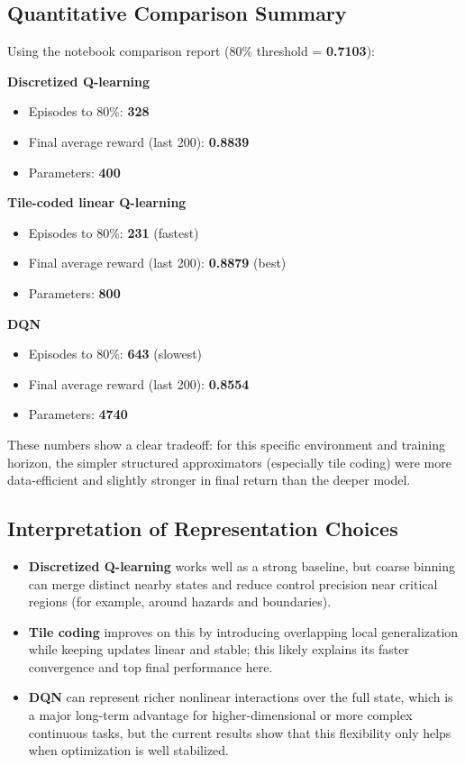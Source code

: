 \documentclass[10pt,twocolumn]{article}
\begin{document}
\subsection*{Quantitative Comparison Summary}
Using the notebook comparison report (80\% threshold = \textbf{0.7103}):

\textbf{Discretized Q-learning}
\begin{itemize}
\item Episodes to 80\%: \textbf{328}
\item Final average reward (last 200): \textbf{0.8839}
\item Parameters: \textbf{400}
\end{itemize}

\textbf{Tile-coded linear Q-learning}
\begin{itemize}
\item Episodes to 80\%: \textbf{231} (fastest)
\item Final average reward (last 200): \textbf{0.8879} (best)
\item Parameters: \textbf{800}
\end{itemize}

\textbf{DQN}
\begin{itemize}
\item Episodes to 80\%: \textbf{643} (slowest)
\item Final average reward (last 200): \textbf{0.8554}
\item Parameters: \textbf{4740}
\end{itemize}

These numbers show a clear tradeoff: for this specific environment and training horizon, the simpler structured approximators (especially tile coding) were more data-efficient and slightly stronger in final return than the deeper model.

\subsection*{Interpretation of Representation Choices}
\begin{itemize}
\item \textbf{Discretized Q-learning} works well as a strong baseline, but coarse binning can merge distinct nearby states and reduce control precision near critical regions (for example, around hazards and boundaries).
\item \textbf{Tile coding} improves on this by introducing overlapping local generalization while keeping updates linear and stable; this likely explains its faster convergence and top final performance here.
\item \textbf{DQN} can represent richer nonlinear interactions over the full state, which is a major long-term advantage for higher-dimensional or more complex continuous tasks, but the current results show that this flexibility only helps when optimization is well stabilized.
\end{itemize}
\end{document}
